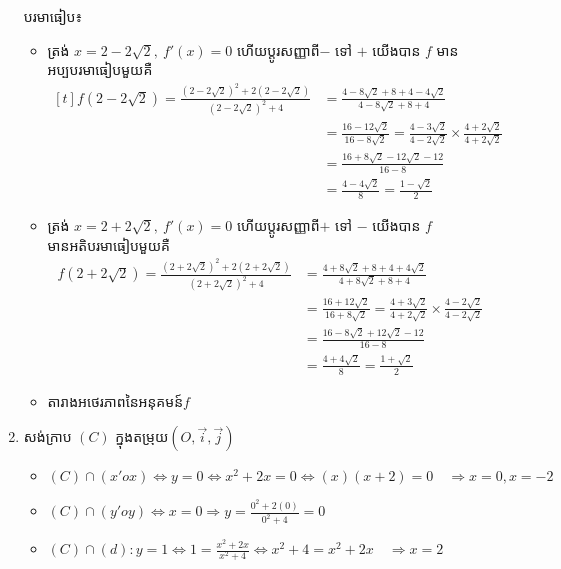 \documentclass[expologarit]{subfiles}
\begin{document}
\begin{enumerate}[k]
បរមាធៀប៖
\begin{itemize}
\item ត្រង់ $x=2-2\sqrt{2},\ f'(x)=0$ ហើយប្តូរសញ្ញាពី$-$ ទៅ $+$ យើងបាន $f$ មានអប្បបរមាធៀបមួយគឺ $\begin{aligned}[t]
f(2-2\sqrt{2})=\frac{\left(2-2\sqrt{2}\right)^2+2\left(2-2\sqrt{2}\right)}{\left(2-2\sqrt{2}\right)^2+4}
&=\frac{4-8\sqrt{2}+8+4-4\sqrt{2}}{4-8\sqrt{2}+8+4}&\\
&=\frac{16-12\sqrt{2}}{16-8\sqrt{2}} =\frac{4-3\sqrt{2}}{4-2\sqrt{2}}\times\frac{4+2\sqrt{2}}{4+2\sqrt{2}}\\
&=\frac{16+8\sqrt{2}-12\sqrt{2}-12}{16-8}\\
&=\frac{4-4\sqrt{2}}{8}=\frac{1-\sqrt{2}}{2}
\end{aligned} $\\
\item ត្រង់ $x=2+2\sqrt{2},\ f'(x)=0$ ហើយប្តូរសញ្ញាពី$+$ ទៅ $-$ យើងបាន $f$ មានអតិបរមាធៀបមួយគឺ 
\begin{align*}
f(2+2\sqrt{2})=\frac{\left(2+2\sqrt{2}\right)^2+2\left(2+2\sqrt{2}\right)}{\left(2+2\sqrt{2}\right)^2+4}
&=\frac{4+8\sqrt{2}+8+4+4\sqrt{2}}{4+8\sqrt{2}+8+4}&\\
&=\frac{16+12\sqrt{2}}{16+8\sqrt{2}} =\frac{4+3\sqrt{2}}{4+2\sqrt{2}}\times\frac{4-2\sqrt{2}}{4-2\sqrt{2}}\\
&=\frac{16-8\sqrt{2}+12\sqrt{2}-12}{16-8}\\
&=\frac{4+4\sqrt{2}}{8}=\frac{1+\sqrt{2}}{2}
\end{align*}
\item តារាងអថេរភាពនៃអនុគមន៍$f$
\\[0.25cm]
\end{itemize}
 \item សង់ក្រាប $(C)$ ក្នុងតម្រុយ$\left(O,\overrightarrow{i},\overrightarrow{j}\right)$
\begin{itemize}
\item $(C)\cap (x'ox)\Leftrightarrow y=0\Leftrightarrow x^2+2x=0\Leftrightarrow (x)(x+2)=0\quad \Rightarrow x=0,x=-2$
\item $(C)\cap (y'oy)\Leftrightarrow x=0\Rightarrow y=\frac{0^2+2(0)}{0^2+4}=0$
\item $(C)\cap (d):y=1\Leftrightarrow 1=\frac{x^2+2x}{x^2+4}\Leftrightarrow x^2+4=x^2+2x\quad \Rightarrow x=2$
\end{itemize} 
 
 \end{enumerate}
\end{document}
